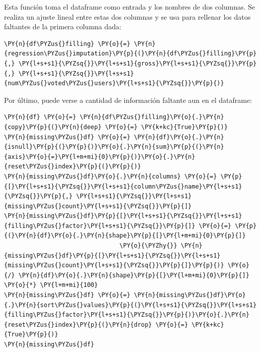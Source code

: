     Esta función toma el dataframe como entrada y los nombres de dos
columnas. Se realiza un ajuste lineal entre estas dos columnas y se usa
para rellenar los datos faltantes de la primera columna dada:

    \begin{tcolorbox}[breakable, size=fbox, boxrule=1pt, pad at break*=1mm,colback=cellbackground, colframe=cellborder]
\begin{Verbatim}[commandchars=\\\{\}]
\PY{n}{df\PYZus{}filling} \PY{o}{=} \PY{n}{regression\PYZus{}imputation}\PY{p}{(}\PY{n}{df\PYZus{}filling}\PY{p}{,} \PY{l+s+s1}{\PYZsq{}}\PY{l+s+s1}{gross}\PY{l+s+s1}{\PYZsq{}}\PY{p}{,} \PY{l+s+s1}{\PYZsq{}}\PY{l+s+s1}{num\PYZus{}voted\PYZus{}users}\PY{l+s+s1}{\PYZsq{}}\PY{p}{)}
\end{Verbatim}
\end{tcolorbox}

    Por último, puede verse a cantidad de información faltante aun en el
dataframe:

    \begin{tcolorbox}[breakable, size=fbox, boxrule=1pt, pad at break*=1mm,colback=cellbackground, colframe=cellborder]
\begin{Verbatim}[commandchars=\\\{\}]
\PY{n}{df} \PY{o}{=} \PY{n}{df\PYZus{}filling}\PY{o}{.}\PY{n}{copy}\PY{p}{(}\PY{n}{deep} \PY{o}{=} \PY{k+kc}{True}\PY{p}{)}
\PY{n}{missing\PYZus{}df} \PY{o}{=} \PY{n}{df}\PY{o}{.}\PY{n}{isnull}\PY{p}{(}\PY{p}{)}\PY{o}{.}\PY{n}{sum}\PY{p}{(}\PY{n}{axis}\PY{o}{=}\PY{l+m+mi}{0}\PY{p}{)}\PY{o}{.}\PY{n}{reset\PYZus{}index}\PY{p}{(}\PY{p}{)}
\PY{n}{missing\PYZus{}df}\PY{o}{.}\PY{n}{columns} \PY{o}{=} \PY{p}{[}\PY{l+s+s1}{\PYZsq{}}\PY{l+s+s1}{column\PYZus{}name}\PY{l+s+s1}{\PYZsq{}}\PY{p}{,} \PY{l+s+s1}{\PYZsq{}}\PY{l+s+s1}{missing\PYZus{}count}\PY{l+s+s1}{\PYZsq{}}\PY{p}{]}
\PY{n}{missing\PYZus{}df}\PY{p}{[}\PY{l+s+s1}{\PYZsq{}}\PY{l+s+s1}{filling\PYZus{}factor}\PY{l+s+s1}{\PYZsq{}}\PY{p}{]} \PY{o}{=} \PY{p}{(}\PY{n}{df}\PY{o}{.}\PY{n}{shape}\PY{p}{[}\PY{l+m+mi}{0}\PY{p}{]} 
                                \PY{o}{\PYZhy{}} \PY{n}{missing\PYZus{}df}\PY{p}{[}\PY{l+s+s1}{\PYZsq{}}\PY{l+s+s1}{missing\PYZus{}count}\PY{l+s+s1}{\PYZsq{}}\PY{p}{]}\PY{p}{)} \PY{o}{/} \PY{n}{df}\PY{o}{.}\PY{n}{shape}\PY{p}{[}\PY{l+m+mi}{0}\PY{p}{]} \PY{o}{*} \PY{l+m+mi}{100}
\PY{n}{missing\PYZus{}df} \PY{o}{=} \PY{n}{missing\PYZus{}df}\PY{o}{.}\PY{n}{sort\PYZus{}values}\PY{p}{(}\PY{l+s+s1}{\PYZsq{}}\PY{l+s+s1}{filling\PYZus{}factor}\PY{l+s+s1}{\PYZsq{}}\PY{p}{)}\PY{o}{.}\PY{n}{reset\PYZus{}index}\PY{p}{(}\PY{n}{drop} \PY{o}{=} \PY{k+kc}{True}\PY{p}{)}
\PY{n}{missing\PYZus{}df}
\end{Verbatim}
\end{tcolorbox}

